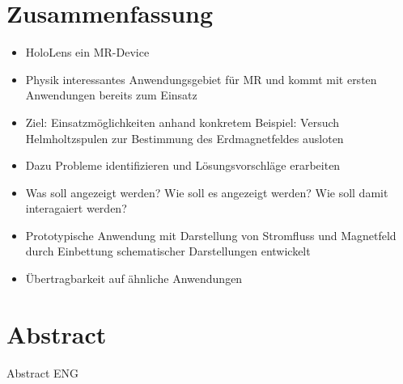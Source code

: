 \section*{Zusammenfassung}
\begin{itemize}
	\item  HoloLens ein MR-Device
	\item Physik interessantes Anwendungsgebiet für MR und kommt mit ersten Anwendungen bereits zum Einsatz
	\item  Ziel: Einsatzmöglichkeiten anhand konkretem Beispiel: Versuch Helmholtzspulen zur Bestimmung des Erdmagnetfeldes ausloten
	\item Dazu Probleme identifizieren und Lösungsvorschläge erarbeiten
	\item Was soll angezeigt werden? Wie soll es angezeigt werden? Wie soll damit interagaiert werden?
	\item Prototypische Anwendung mit Darstellung von Stromfluss und Magnetfeld durch Einbettung schematischer Darstellungen entwickelt
	\item Übertragbarkeit auf ähnliche Anwendungen
\end{itemize}

\section*{Abstract}
Abstract ENG